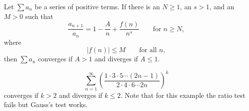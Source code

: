     \begin{theoremenv}
        Let \(\sum a_n\) be a series of positive terms. If there is an \(N\ge 1\), an \(s>1\), and an \(M>0\) such that
        \[
        \frac{a_{n+1}}{a_n}
        =
        1-\frac{A}{n}
        +
        \frac{f(n)}{n^s}
        \qquad
        \text{for } n\ge N,
        \]
        where
        \[
        |f(n)|\le M
        \qquad
        \text{for all } n,
        \]
        then \(\sum a_n\) converges if \(A>1\) and diverges if \(A\le 1\).
    \end{theoremenv}
    \begin{exampleenv}
        $$
        \sum_{n=1}^\infty \left( \frac{1\cdot 3 \cdot 5 \cdots (2n-1)}{2\cdot 4 \cdot 6 \cdots 2n} \right)^k
        $$
        converges if $k>2$ and diverges if $k\le 2$. Note that for this example the ratio test fails but Gauss's test works.
    \end{exampleenv}
